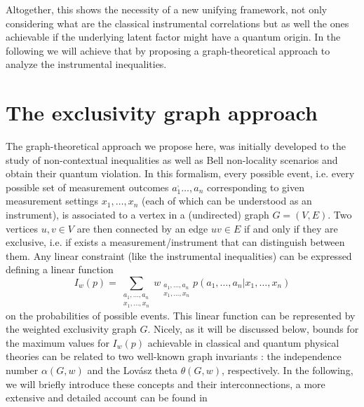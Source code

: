 \documentclass[letterpaper]{article}
\newcommand{\avg}[1]{\langle#1\rangle}
\begin{document}
Altogether, this shows the necessity of a new unifying framework, not only
considering what are the classical instrumental correlations but as well the
ones achievable if the underlying latent factor might have a quantum origin. In
the following we will achieve that by proposing a graph-theoretical approach to analyze the instrumental inequalities.


\section*{The exclusivity graph approach}

The graph-theoretical approach we propose here, was initially developed to the study of non-contextual inequalities \cite{cabello2014} as well as Bell non-locality scenarios \cite{acin2015} and obtain their quantum violation. In this formalism, every possible event, i.e. every possible set of measurement outcomes $a_1^,\ldots, a_n$ corresponding to given measurement settings $x_1,\ldots,x_n$ (each of which can be understood as an instrument), is associated to a vertex in a (undirected) graph $G = (V, E)$. Two vertices $u, v \in V$ are then connected by an edge $uv \in E$ if and only if they are exclusive, i.e.  if exists a measurement/instrument that can distinguish between them. Any linear constraint (like the instrumental inequalities) can be expressed defining a linear function 
\begin{equation}
    I_w(p) = \sum_{\substack{a_1,\ldots,a_n\\x_1,\ldots,x_n}}
w_{\substack{a_1,\ldots,a_n\\x_1,\ldots,x_n}} p(a_1,\ldots,a_n|x_1,\ldots,x_n)
\end{equation}
on the probabilities of possible events. This linear function can be represented by the weighted exclusivity graph $G$. Nicely, as it will be discussed below, bounds for the maximum values for $ I_w(p)$ achievable in classical and quantum physical theories can be related to two well-known graph invariants \cite{}: the independence number $\alpha(G, w)$ and the Lovász theta $\theta(G, w)$, respectively. In the following, we will briefly introduce these concepts and their interconnections, a more extensive and detailed account can be found in \cite{cabello2014, rabelo2014,acin2015}
\end{document}
